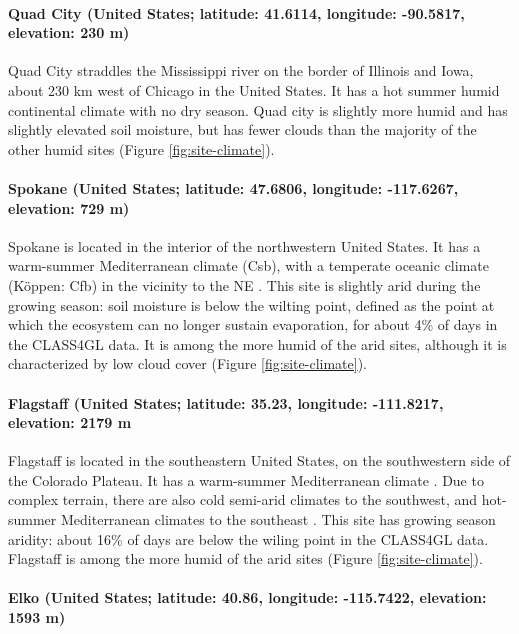 \documentclass[12pt]{article}
\begin{document}
\paragraph{Quad City (United States; latitude: 41.6114, longitude:
  -90.5817, elevation: 230 m)}

Quad City straddles the Mississippi river on the border of Illinois
and Iowa, about 230 km west of Chicago in the United States. It has a
hot summer humid continental climate \cite[K\"{o}ppen:
  Dfa][]{rubel2010} with no dry season. Quad city is slightly more
humid and has slightly elevated soil moisture, but has fewer clouds
than the majority of the other humid sites (Figure \ref{fig:site-climate}).

\paragraph{Spokane (United States; latitude: 47.6806, longitude:
  -117.6267, elevation: 729 m)}

Spokane is located in the interior of the northwestern United
States. It has a warm-summer Mediterranean climate (Csb), with a
temperate oceanic climate (K\"{o}ppen: Cfb) in the vicinity to the NE
\cite{rubel2010}. This site is slightly arid during the growing
season: soil moisture is below the wilting point, defined as the
point at which the ecosystem can no longer sustain evaporation, for
about 4\% of days in the CLASS4GL data. It is among the more humid of
the arid sites, although it is characterized by low cloud cover
(Figure \ref{fig:site-climate}).

\paragraph{Flagstaff (United States; latitude: 35.23, longitude: -111.8217, elevation: 2179 m}

Flagstaff is located in the southeastern United States, on the
southwestern side of the Colorado Plateau. It has a warm-summer
Mediterranean climate \cite[K\"{o}ppen: Csb,][]{rubel2010}. Due to
complex terrain, there are also cold semi-arid climates
\cite[K\"{o}ppen: BSk,][]{rubel2010} to the southwest, and hot-summer
Mediterranean climates to the southeast \cite[K\"{o}ppen:
  Csa,][]{rubel2010}. This site has growing season aridity: about 16\%
of days are below the wiling point in the CLASS4GL data. Flagstaff is
among the more humid of the arid sites (Figure \ref{fig:site-climate}).

\paragraph{Elko (United States; latitude: 40.86, longitude: -115.7422,
  elevation: 1593 m)}
\end{document}
